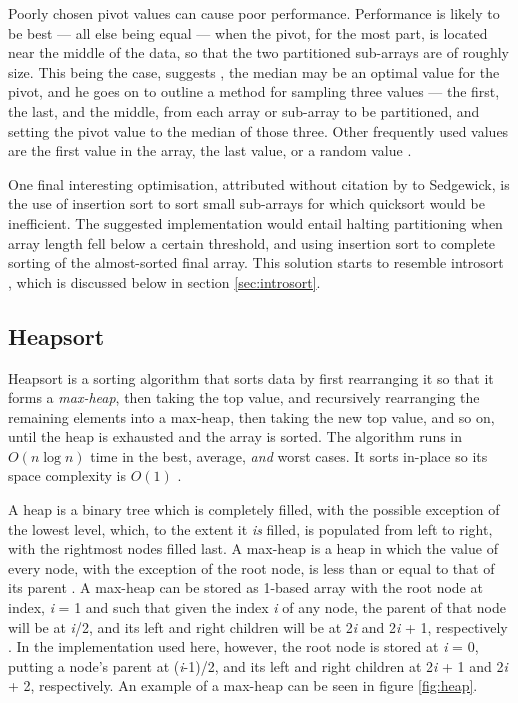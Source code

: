 \documentclass[12pt, a4paper]{article}
\begin{document}
Poorly chosen pivot values can cause poor performance. Performance is likely to be best — all else being equal — when the pivot, for the most part, is located near the middle of the data, so that the two partitioned sub-arrays are of roughly size. This being the case, suggests \textcite[851]{Sedgewick-1978}, the median may be an optimal value for the pivot, and he goes on to outline a method for sampling three values — the first, the last, and the middle, from each array or sub-array to be partitioned, and setting the pivot value to the median of those three. Other frequently used values are the first value in the array, the last value, or a random value \autocite*[73]{heineman2016algorithms}.

One final interesting optimisation, attributed without citation by \textcite[121]{bentley:pearls} to Sedgewick, is the use of insertion sort to sort small sub-arrays for which quicksort would be inefficient. The suggested implementation would entail halting partitioning when array length fell below a certain threshold, and using insertion sort to complete sorting of the almost-sorted final array. This solution starts to resemble introsort \autocite{musser1997}, which is discussed below in section \ref{sec:introsort}.


\subsection{Heapsort}

Heapsort is a sorting algorithm that sorts data by first rearranging it so that it forms a \emph{max-heap}, then taking the top value, and recursively rearranging the remaining elements into a max-heap, then taking the new top value, and so on, until the heap is exhausted and the array is sorted. The algorithm runs in $O(n\log n)$ time in the best, average, \emph{and} worst cases. It sorts in-place so its space complexity is $O(1)$ \autocite[129]{cormen01}.

A heap is a binary tree which is completely filled, with the possible exception of the lowest level, which, to the extent it  \emph{is} filled, is populated from left to right, with the rightmost nodes filled last. A max-heap is a heap in which the value of every node, with the exception of the root node, is less than or equal to that of its parent \autocite[127-129]{cormen01}. A max-heap can be stored as 1-based array with the root node at index, \emph{i} = 1 and such that given the index \emph{i} of any node, the parent of that node will be at \emph{i}/2, and its left and right children will be at 2\emph{i} and 2\emph{i} + 1, respectively \autocites[128]{cormen01}[148]{bentley:pearls}. In the implementation used here, however, the root node is stored at \emph{i} = 0, putting a node's parent at (\emph{i}-1)/2, and its left and right children at 2\emph{i} + 1 and 2\emph{i} + 2, respectively. An example of a max-heap can be seen in figure \ref{fig:heap}.
\end{document}
